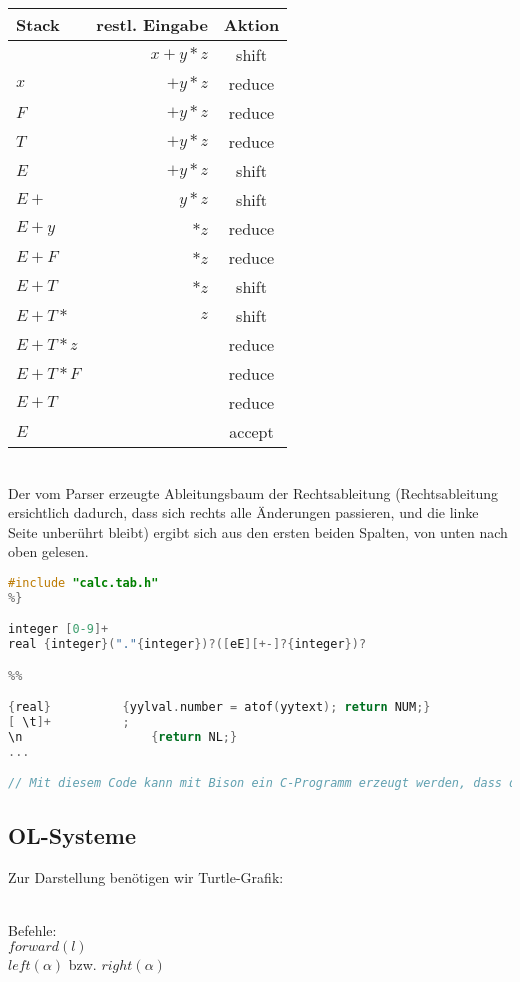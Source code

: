 \documentclass{scrreprt}
\begin{document}
\begin{tabular}{l r c}
Stack & restl. Eingabe &Aktion\\
\hline
& $x+y*z$ & shift\\
$x$ & $+y*z$ & reduce\\
$F$ & $+y*z$ & reduce\\
$T$ & $+y*z$ & reduce\\
$E$ & $+y*z$ & shift \\
$E+$ & $y*z$ & shift \\
$E+y$ & $*z$ & reduce\\
$E+F$ & $*z$ & reduce\\
$E+T$ & $*z$ & shift\footnotemark\\
$E+T*$ & $z$ & shift \\
$E+T*z$ & & reduce \\
$E+T*F$ & & reduce \\
$E+T$ & & reduce \\
$E$ & & accept
\end{tabular}
\\
Der vom Parser erzeugte Ableitungsbaum der Rechtsableitung (Rechtsableitung ersichtlich dadurch, dass sich rechts alle Änderungen passieren, und die linke Seite unberührt bleibt) ergibt sich aus den ersten beiden Spalten, von unten nach oben gelesen.
\begin{lstlisting}[language=C]
%{
#include "calc.tab.h"
%}

integer [0-9]+
real {integer}("."{integer})?([eE][+-]?{integer})?

%%

{real}			{yylval.number = atof(yytext); return NUM;}
[ \t]+			;
\n					{return NL;}
...

// Mit diesem Code kann mit Bison ein C-Programm erzeugt werden, dass diesen Parser implementiert
\end{lstlisting}


\subsection{OL-Systeme}
Zur Darstellung benötigen wir Turtle-Grafik:\\
\\
Befehle:\\
$forward (l)$ \\
$left (\alpha)$ bzw. $right(\alpha)$
\end{document}
